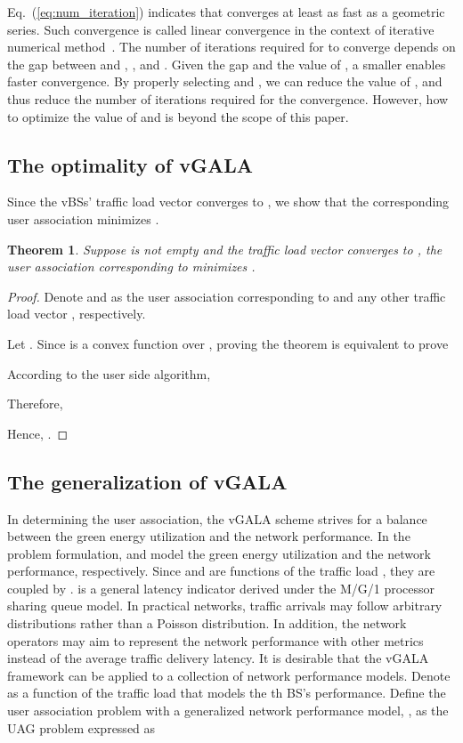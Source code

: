 \documentclass[journal]{IEEEtran}
\newtheorem{theorem}{Theorem}
\theoremstyle{definition}
\begin{document}
Eq.~(\ref{eq:num_iteration}) indicates that  converges at least as fast as a geometric series. Such convergence is called linear convergence in the context of iterative numerical method~\cite{Boyd:2004:CVX}. The number of iterations required for  to converge depends on the gap between  and , , and . Given the gap and the value of , a smaller  enables faster convergence. By properly selecting  and , we can reduce the value of , and thus reduce the number of iterations required for the convergence. However, how to optimize the value of  and  is beyond the scope of this paper.

\subsection{The optimality of vGALA}
\label{subsec:optimal}
Since the vBSs' traffic load vector converges to , we show that the corresponding user association minimizes .
\begin{theorem}
\label{thm:opt_vgala}
Suppose  is not empty and the traffic load vector converges to , the user association corresponding to  minimizes .
\end{theorem}
\begin{proof}
\label{prf:opt_vgala}
Denote  and  as the user association corresponding to  and any other traffic load vector , respectively.

Let .
Since  is a convex function over , proving the theorem is equivalent to prove


According to the user side algorithm,

Therefore,

Hence, .
\end{proof}


\subsection{The generalization of vGALA}
In determining the user association, the vGALA scheme strives for a balance between the green energy utilization and the network performance. In the problem formulation,  and  model the green energy utilization and the network performance, respectively. Since  and  are functions of the traffic load , they are coupled by .  is a general latency indicator derived under the M/G/1 processor sharing queue model. In practical networks, traffic arrivals may follow arbitrary distributions rather than a Poisson distribution. In addition, the network operators may aim to represent the network performance with other metrics instead of the average traffic delivery latency. It is desirable that the vGALA framework can be applied to a collection of network performance models. Denote  as a function of the traffic load  that models the th BS's performance. Define the user association problem with a generalized network performance model, , as the UAG problem expressed as
\end{document}
